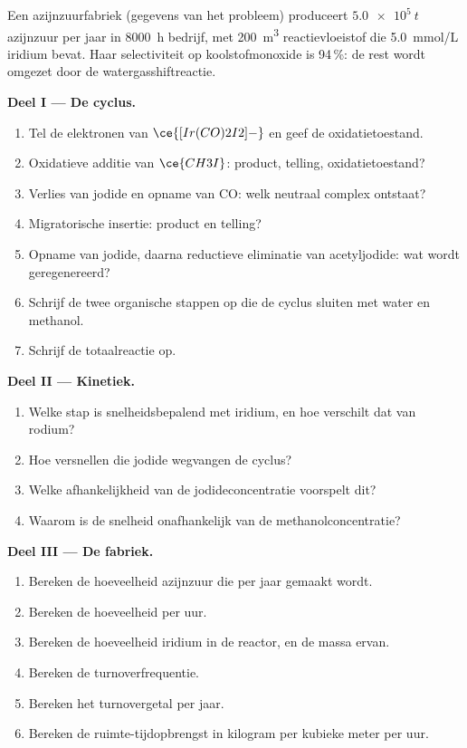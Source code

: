 \begin{problem}
\label{pb:b3:homogeneous-catalysis:1}
Een azijnzuurfabriek (gegevens van het probleem) produceert $\qty{5.0e5}{t}$ azijnzuur per jaar
in \qty{8000}{h} bedrijf, met \qty{200}{m^3} reactievloeistof die \qty{5.0}{mmol/L}
iridium bevat. Haar selectiviteit op koolstofmonoxide is 94\,\%: de rest
wordt omgezet door de watergasshiftreactie.

\medskip\noindent\textbf{Deel I --- De cyclus.}
\begin{enumerate}
  \item Tel de elektronen van $\ce{[Ir(CO)2I2]-}$ en geef de oxidatietoestand.
  \item Oxidatieve additie van $\ce{CH3I}$: product, telling, oxidatietoestand?
  \item Verlies van jodide en opname van CO: welk neutraal complex
        ontstaat?
  \item Migratorische insertie: product en telling?
  \item Opname van jodide, daarna reductieve eliminatie van acetyljodide:
        wat wordt geregenereerd?
  \item Schrijf de twee organische stappen op die de cyclus sluiten met
        water en methanol.
  \item Schrijf de totaalreactie op.
\end{enumerate}

\medskip\noindent\textbf{Deel II --- Kinetiek.}
\begin{enumerate}[resume]
  \item Welke stap is snelheidsbepalend met iridium, en hoe verschilt dat
        van rodium?
  \item Hoe versnellen  die jodide wegvangen de cyclus?
  \item Welke afhankelijkheid van de jodideconcentratie voorspelt dit?
  \item Waarom is de snelheid onafhankelijk van de methanolconcentratie?
\end{enumerate}

\medskip\noindent\textbf{Deel III --- De fabriek.}
\begin{enumerate}[resume]
  \item Bereken de hoeveelheid azijnzuur die per jaar gemaakt wordt.
  \item Bereken de hoeveelheid per uur.
  \item Bereken de hoeveelheid iridium in de reactor, en de massa ervan.
  \item Bereken de turnoverfrequentie.
  \item Bereken het turnovergetal per jaar.
  \item Bereken de ruimte-tijdopbrengst in kilogram per kubieke meter per
        uur.
\end{enumerate}


\end{problem}
